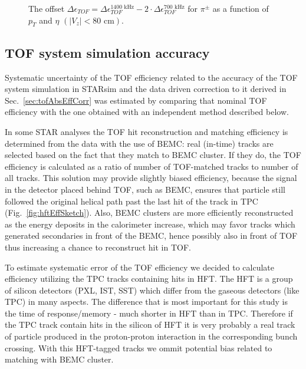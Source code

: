 \begin{figure}[H]
{	}%
	\caption[The difference $\Delta\epsilon_{ TOF} =\Delta\epsilon_{ TOF}^{1400\text{ kHz}}-2\cdot\Delta\epsilon_{ TOF}^{700\text{ kHz}}$ for $\pi^\pm$ as a function of $p_T$ and $\eta$ $\left(|V_z|<80\text{ cm}\right)$]{The offset $\Delta\epsilon_{ TOF} =\Delta\epsilon_{ TOF}^{1400\text{ kHz}}-2\cdot\Delta\epsilon_{ TOF}^{700\text{ kHz}}$ for $\pi^\pm$ as a function of $p_T$ and $\eta$ $\left(|V_z|<80\text{ cm}\right)$. }
	\label{fig:systError2Dtof}
\end{figure}



\subsection{TOF system simulation accuracy}\label{subsec:tofAbsEffSystAndCorr}

Systematic uncertainty of the TOF efficiency related to the accuracy of the TOF system simulation in STARsim and the data driven correction to it derived in Sec.~\ref{sec:tofAbsEffCorr} was estimated by comparing that nominal TOF efficiency with the one obtained with an independent method described below.

In some STAR analyses the TOF hit reconstruction and matching efficiency is determined from the data with the use of BEMC: real (in-time) tracks are selected based on the fact that they match to BEMC cluster. If they do, the TOF efficiency is calculated as a ratio of number of TOF-matched tracks to number of all tracks. This solution may provide slightly biased efficiency, because the signal in the detector placed behind TOF, such as BEMC, ensures that particle still followed the original helical path past the last hit of the track in TPC (Fig.~\ref{fig:hftEffSketch}). Also, BEMC clusters are more efficiently reconstructed as the energy deposits in the calorimeter increase, which may favor tracks which generated secondaries in front of the BEMC, hence possibly also in front of TOF thus increasing a chance to reconstruct hit in TOF.

To estimate systematic error of the TOF efficiency we decided to calculate efficiency utilizing the TPC tracks containing hits in HFT. The HFT is a group of silicon detectors (PXL, IST, SST) which differ from the gaseous detectors (like TPC) in many aspects. The difference that is most important for this study is the time of response/memory - much shorter in HFT than in TPC. Therefore if the TPC track contain hits in the silicon of HFT it is very probably a real track of particle produced in the proton-proton interaction in the corresponding bunch crossing. With this HFT-tagged tracks we ommit potential bias related to matching with BEMC cluster.

